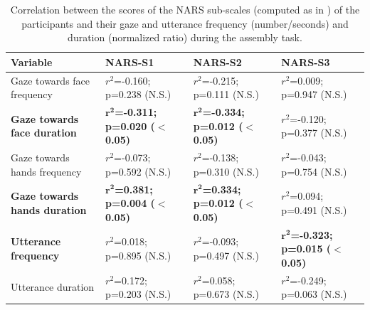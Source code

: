 \documentclass[twocolumn]{svjour3}          %
\begin{document}
\begin{table}
\centering
\begin{tabular}{|p{5.5cm}|p{2.9cm}|p{2.9cm}|p{2.9cm}|}
\hline
Variable & \textbf{NARS-S1} & \textbf{NARS-S2} & \textbf{NARS-S3} \\
\hline
\hline
Gaze towards face frequency  & $r^2$=-0.160; p=0.238 (N.S.)	 & $r^2$=-0.215; p=0.111 (N.S.)	& $r^2$=0.009; p=0.947 (N.S.) \\
\textbf{Gaze towards face duration}  & \textbf{$\mathbf{r^2}$=-0.311; p=0.020 ($\mathbf{<}$0.05)}	& \textbf{$\mathbf{r^2}$=-0.334; p=0.012 ($\mathbf{<}$0.05)}	& $r^2$=-0.120; p=0.377 (N.S.)\\
\hline
Gaze towards hands frequency  & $r^2$=-0.073; p=0.592	(N.S.) & $r^2$=-0.138; p=0.310	(N.S.) & $r^2$=-0.043; p=0.754 (N.S.)\\
\textbf{Gaze towards hands duration}  & \textbf{$\mathbf{r^2}$=0.381; p=0.004 ($\mathbf{<}$0.05)}	& \textbf{$\mathbf{r^2}$=0.334; p=0.012	($\mathbf{<}$0.05)} & $r^2$=0.094; p=0.491 (N.S.)\\
\hline
\textbf{Utterance frequency}  & $r^2$=0.018; p=0.895 (N.S.)	& $r^2$=-0.093; p=0.497	 (N.S.)& \textbf{$\mathbf{r^2}$=-0.323; p=0.015 ($\mathbf{<}$0.05)} \\
Utterance duration   &	$r^2$=0.172; p=0.203 (N.S.)	& $r^2$=0.058; p=0.673 (N.S.) &	$r^2$=-0.249; p=0.063 (N.S.) \\
\hline
\end{tabular}
\caption{Correlation between the scores of the NARS sub-scales (computed as in \cite{NARS2006}) of the participants and their gaze and utterance frequency (number/seconds) and duration (normalized ratio) during the assembly task.}
\label{table:narsspecific}
\end{table}
\end{document}
